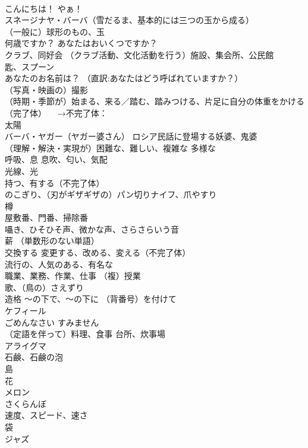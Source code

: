 \documentclass[8pt]{extreport}
\begin{document}
\begin{CJK}{UTF8}{min}
\\	こんにちは！ やぁ！
\\	スネージナヤ・バーバ（雪だるま、基本的には三つの玉から成る）
\\	（一般に）球形のもの、玉
\\	何歳ですか？ あなたはおいくつですか？
\\	クラブ、同好会 （クラブ活動、文化活動を行う）施設、集会所、公民館
\\	匙、スプーン
\\	あなたのお名前は？ （直訳:あなたはどう呼ばれていますか？）
\\	（写真・映画の）撮影
\\	（時期・季節が）始まる、来る／踏む、踏みつける、片足に自分の体重をかける（完了体） 　→不完了体：
\\	太陽
\\	バーバ・ヤガー（ヤガー婆さん） ロシア民話に登場する妖婆、鬼婆
\\	（理解・解決・実現が）困難な、難しい、複雑な 多様な
\\	呼吸、息 息吹、匂い、気配
\\	光線、光
\\	持つ、有する（不完了体）
\\	のこぎり、（刃がギザギザの）パン切りナイフ、爪やすり
\\	樽
\\	屋敷番、門番、掃除番
\\	囁き、ひそひそ声、微かな声、さらさらいう音
\\	薪 （単数形のない単語）
\\	交換する 変更する、改める、変える（不完了体）
\\	流行の、人気のある、有名な
\\	職業、業務、作業、仕事 （複）授業
\\	歌、（鳥の）さえずり
\\	造格	～の下で、〜の下に （背番号）を付けて
\\	ケフィール
\\	ごめんなさい すみません
\\	（定語を伴って）料理、食事 台所、炊事場
\\	アライグマ
\\	石鹸、石鹸の泡
\\	島
\\	花
\\	メロン
\\	さくらんぼ
\\	速度、スピード、速さ
\\	袋
\\	ジャズ

\end{CJK}
\end{document}
